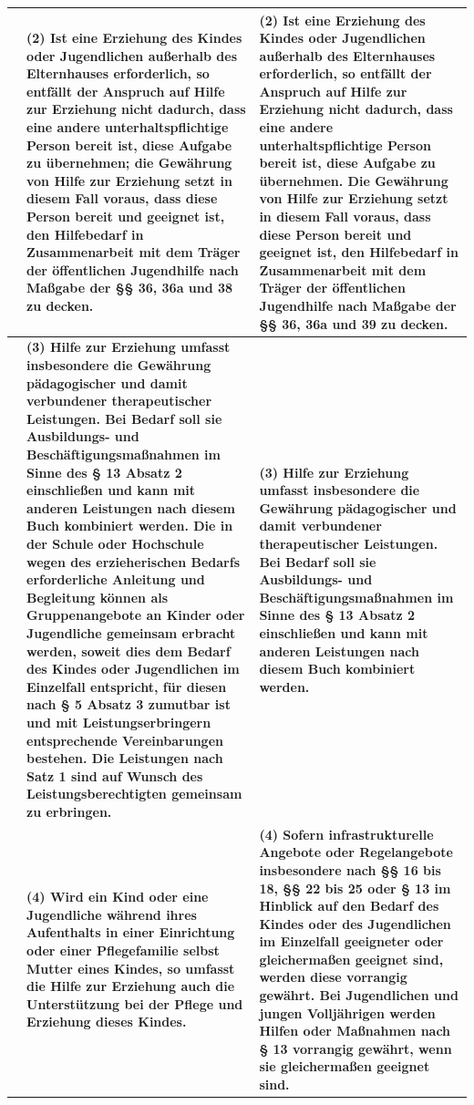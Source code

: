 \documentclass[10pt,a4paper,landscape]{article}
\begin{document}
\begin{longtable}{|L{8.6cm}|L{8.6cm}|L{8.6cm}|}
 & \textbf{(2) Ist eine Erziehung des Kindes oder Jugendlichen außerhalb des Elternhauses erforderlich, so entfällt der Anspruch auf Hilfe zur Erziehung nicht dadurch, dass eine andere unterhaltspflichtige Person bereit ist, diese Aufgabe zu übernehmen; die Gewährung von Hilfe zur Erziehung setzt in diesem Fall voraus, dass diese Person bereit und geeignet ist, den Hilfebedarf in Zusammenarbeit mit dem Träger der öffentlichen Jugendhilfe nach Maßgabe der \S{}\S{} 36, 36a und 38 zu decken. } & \textbf{(2)} \textbf{Ist eine Erziehung des Kindes oder Jugendlichen außerhalb des Elternhauses erforderlich, so entfällt der Anspruch auf Hilfe zur Erziehung nicht dadurch, dass eine andere unterhaltspflichtige Person bereit ist, diese Aufgabe zu übernehmen. Die Gewährung von Hilfe zur Erziehung setzt in diesem Fall voraus, dass diese Person bereit und geeignet ist, den Hilfebedarf in Zusammenarbeit mit dem Träger der öffentlichen Jugendhilfe nach Maßgabe der \S{}\S{} 36, 36a und 39 zu decken. } \\
\hline
 & \textbf{(3) Hilfe zur Erziehung umfasst insbesondere die Gewährung pädagogischer und damit verbundener therapeutischer Leistungen. Bei Bedarf soll sie Ausbildungs- und Beschäftigungsmaßnahmen im Sinne des \S{} 13 Absatz 2 einschließen und kann mit anderen Leistungen nach diesem Buch kombiniert werden. Die in der Schule oder Hochschule wegen des erzieherischen Bedarfs erforderliche Anleitung und Begleitung können als Gruppenangebote an Kinder oder Jugendliche gemeinsam erbracht werden, soweit dies dem Bedarf des Kindes oder Jugendlichen im Einzelfall entspricht, für diesen nach \S{} 5 Absatz 3 zumutbar ist und mit Leistungserbringern entsprechende Vereinbarungen bestehen. Die Leistungen nach Satz 1 sind auf Wunsch des Leistungsberechtigten gemeinsam zu erbringen. } & \textbf{(3) Hilfe zur Erziehung umfasst insbesondere die Gewährung pädagogischer und damit verbundener therapeutischer Leistungen. Bei Bedarf soll sie Ausbildungs- und Beschäftigungsmaßnahmen im Sinne des \S{} 13 Absatz 2 einschließen und kann mit anderen Leistungen nach diesem Buch kombiniert werden. } \\
\hline
 & \textbf{(4) Wird ein Kind oder eine Jugendliche während ihres Aufenthalts in einer Einrichtung oder einer Pflegefamilie selbst Mutter eines Kindes, so umfasst die Hilfe zur Erziehung auch die Unterstützung bei der Pflege und Erziehung dieses Kindes. } & \textbf{(4) Sofern infrastrukturelle Angebote oder Regelangebote insbesondere nach \S{}\S{} 16 bis 18, \S{}\S{} 22 bis 25 oder \S{} 13 im Hinblick auf den Bedarf des Kindes oder des Jugendlichen im Einzelfall geeigneter oder gleichermaßen geeignet sind, werden diese vorrangig gewährt. Bei Jugendlichen und jungen Volljährigen werden Hilfen oder Maßnahmen nach \S{} 13 vorrangig gewährt, wenn sie gleichermaßen geeignet sind. } \\

\end{longtable}
\end{document}
